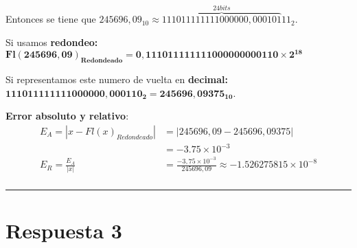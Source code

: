 \documentclass{article}
\begin{document}
{\noindent
	Entonces se tiene que $245696,09_{10} \approx \overbrace{111011111111000000,000101}^{24 bits}11_{2}$. \newline

\noindent	
	Si usamos \textbf{redondeo:} \newline
	$\boldsymbol{Fl(245696,09)_{Redondeado} = 0,111011111111000000000110 \times 2^{18}}$
	\newline

\noindent	
	Si representamos este numero de vuelta en \textbf{decimal:} \newline
	$\boldsymbol{111011111111000000,000110_{2} = 245696,09375_{10}}$. \newline
	

\noindent	
	\textbf{Error absoluto y relativo}:
	\begin{align*}
	E_{A} = |x - Fl(x)_{Redondeado}| & = |245696,09 - 245696,09375| \\
	& = -3.75 \times 10^{-3} \\
	E_{R} = \frac{E_{A}}{|x|} & = \frac{-3,75 \times 10^{-3}}{245696,09} \approx -1.526275815 \times 10^{-8} \\
	\end{align*}
}

	


\hrule
\section*{Respuesta 3}
\end{document}

